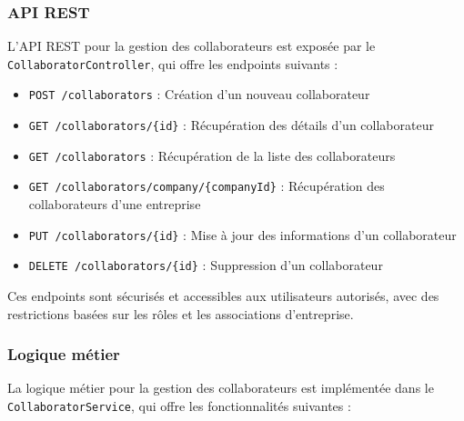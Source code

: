 \subsubsection{API REST}

L'API REST pour la gestion des collaborateurs est exposée par le \texttt{CollaboratorController}, qui offre les endpoints suivants :

\vspace{0.5cm}

\begin{tcolorbox}[
  title={\textbf{Endpoints de gestion des collaborateurs}},
  colback=blue!5!white,
  colframe=primarycolor,
  fonttitle=\bfseries,
  boxrule=0.5mm,
  arc=2mm,
  left=6mm,
  right=6mm,
  top=6mm,
  bottom=6mm
]
\begin{itemize}[leftmargin=*,label=\textcolor{darkgray}{$\bullet$},itemsep=0.3em]
  \item \texttt{POST /collaborators} : Création d'un nouveau collaborateur
  \item \texttt{GET /collaborators/\{id\}} : Récupération des détails d'un collaborateur
  \item \texttt{GET /collaborators} : Récupération de la liste des collaborateurs
  \item \texttt{GET /collaborators/company/\{companyId\}} : Récupération des collaborateurs d'une entreprise
  \item \texttt{PUT /collaborators/\{id\}} : Mise à jour des informations d'un collaborateur
  \item \texttt{DELETE /collaborators/\{id\}} : Suppression d'un collaborateur
\end{itemize}
\end{tcolorbox}

\vspace{0.5cm}

Ces endpoints sont sécurisés et accessibles aux utilisateurs autorisés, avec des restrictions basées sur les rôles et les associations d'entreprise.

\newpage

\subsubsection{Logique métier}

La logique métier pour la gestion des collaborateurs est implémentée dans le \texttt{CollaboratorService}, qui offre les fonctionnalités suivantes :

\vspace{0.5cm}

